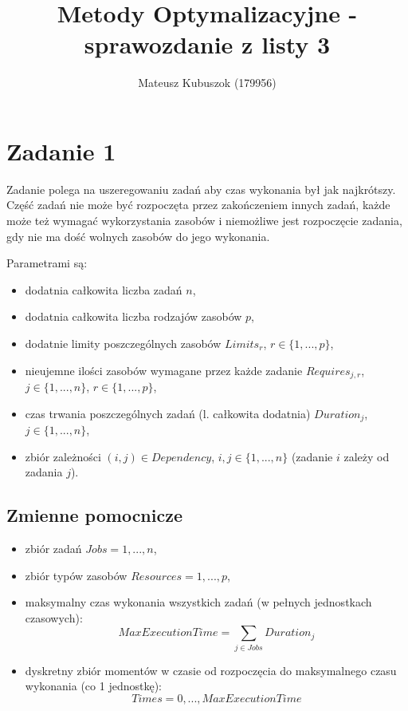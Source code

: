 \documentclass[polish,12pt,titlepage]{article}
\begin{document}
\title{Metody Optymalizacyjne - sprawozdanie z listy 3}
\author{Mateusz Kubuszok (179956)}
\maketitle

\section{Zadanie 1}

Zadanie polega na uszeregowaniu zadań aby czas wykonania był jak najkrótszy. Część zadań nie może być rozpoczęta przez zakończeniem innych zadań, każde może też wymagać wykorzystania zasobów i niemożliwe jest rozpoczęcie zadania, gdy nie ma dość wolnych zasobów do jego wykonania.

Parametrami są:
\begin{itemize}
	\item dodatnia całkowita liczba zadań $n$,
	\item dodatnia całkowita liczba rodzajów zasobów $p$,
	\item dodatnie limity poszczególnych zasobów $Limits_r$, $r \in \{1, ..., p\}$,
	\item nieujemne ilości zasobów wymagane przez każde zadanie $Requires_{j,r}$, $j \in \{1, ..., n\}$, $r \in \{1, ..., p\}$,
	\item czas trwania poszczególnych zadań (l. całkowita dodatnia) $Duration_j$, $j \in \{1, ..., n\}$,
	\item zbiór zależności $(i,j) \in Dependency$, $i,j \in \{1, ..., n\}$ (zadanie $i$ zależy od zadania $j$).
\end{itemize} 

\subsection{Zmienne pomocnicze}

\begin{itemize}
	\item zbiór zadań $Jobs = {1, ..., n}$,
	\item zbiór typów zasobów $Resources = {1, ..., p}$,
	\item maksymalny czas wykonania wszystkich zadań (w pełnych jednostkach czasowych):
	$$MaxExecutionTime = \sum\limits_{j \in Jobs} Duration_j$$
	\item dyskretny zbiór momentów w czasie od rozpoczęcia do maksymalnego czasu wykonania (co 1 jednostkę):
	$$Times = {0, ..., MaxExecutionTime}$$
\end{itemize}
\end{document}
